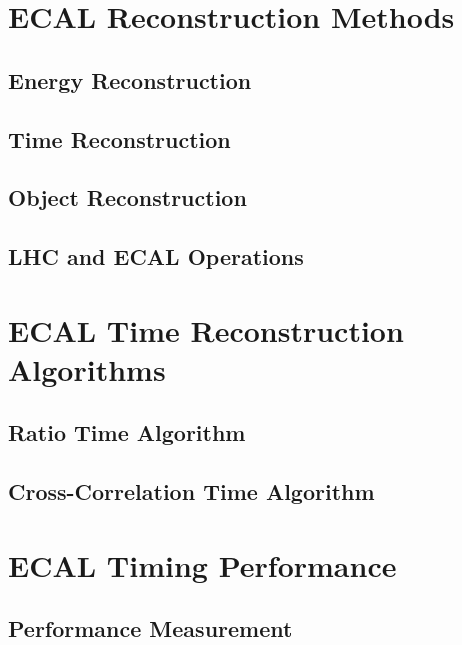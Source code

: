 \documentclass{cmspaper}
\begin{document}
\section{ECAL Reconstruction Methods \label{sec:reco}}
\subsection{Energy Reconstruction \label{sec:reco1}}

\FloatBarrier

\subsection{Time Reconstruction \label{sec:reco2}}

\FloatBarrier

\subsection{Object Reconstruction \label{sec:reco3}}

\FloatBarrier

\subsection{LHC and ECAL Operations \label{sec:reco4}}

\FloatBarrier

\section{ECAL Time Reconstruction Algorithms \label{sec:algo}}
\subsection{Ratio Time Algorithm \label{sec:algo1}}

\FloatBarrier

\subsection{Cross-Correlation Time Algorithm \label{sec:algo2}}

\FloatBarrier

\section{ECAL Timing Performance \label{sec:res}}
\subsection{Performance Measurement \label{sec:resmeth}}
\end{document}
